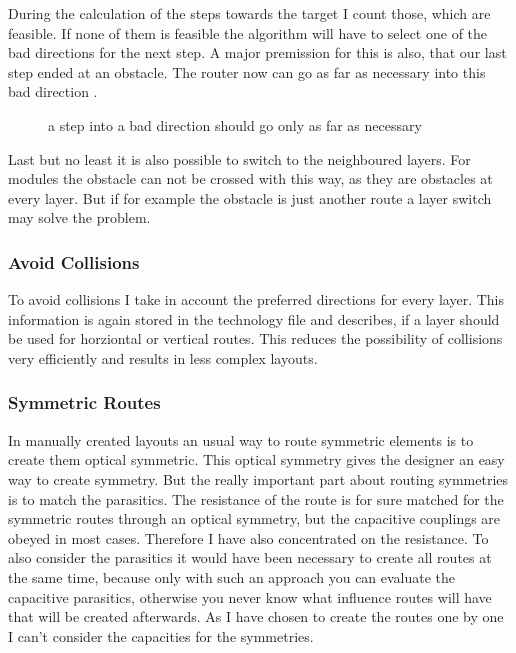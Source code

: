 During the calculation of the steps towards the target I count those, which are feasible. If none of them is feasible the algorithm will have to select one of the bad directions for the next step. A major premission for this is also, that our last step ended at an obstacle. The router now can go as far as necessary into this bad direction .

\begin{figure}
	\centering
	
 	\caption{a step into a bad direction should go only as far as necessary}
	\label{fig:router_as_far_as_necessary}
\end{figure}

Last but no least it is also possible to switch to the neighboured layers. For modules the obstacle can not be crossed with this way, as they are obstacles at every layer. But if for example the obstacle is just another route a layer switch may solve the problem.

\subsubsection{Avoid Collisions}
To avoid collisions I take in account the preferred directions for every layer. This information is again stored in the technology file and describes, if a layer should be used for horziontal or vertical routes. This reduces the possibility of collisions very efficiently and results in less complex layouts.

\subsubsection{Symmetric Routes}
In manually created layouts an usual way to route symmetric elements is to create them optical symmetric. This optical symmetry gives the designer an easy way to create symmetry. But the really important part about routing symmetries is to match the parasitics. The resistance of the route is for sure matched for the symmetric routes through an optical symmetry, but the capacitive couplings are obeyed in most cases. Therefore I have also concentrated on the resistance. To also consider the parasitics it would have been necessary to create all routes at the same time, because only with such an approach you can evaluate the capacitive parasitics, otherwise you never know what influence routes will have that will be created afterwards. As I have chosen to create the routes one by one I can't consider the capacities for the symmetries.

